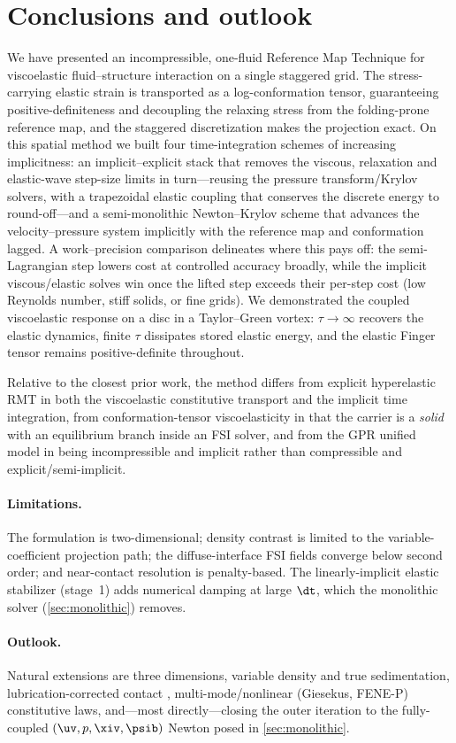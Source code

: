 \section{Conclusions and outlook}
\label{sec:conclusion}

We have presented an incompressible, one-fluid Reference Map Technique for viscoelastic
fluid--structure interaction on a single staggered grid. The stress-carrying elastic
strain is transported as a log-conformation tensor, guaranteeing positive-definiteness and
decoupling the relaxing stress from the folding-prone reference map, and the staggered
discretization makes the projection exact. On this spatial method we built four
time-integration schemes of increasing implicitness: an implicit--explicit stack that
removes the viscous, relaxation and elastic-wave step-size limits in turn---reusing the
pressure transform/Krylov solvers, with a trapezoidal elastic coupling that conserves the
discrete energy to round-off---and a semi-monolithic Newton--Krylov scheme that advances
the velocity--pressure system implicitly with the reference map and conformation lagged.
A work--precision comparison delineates where this pays off: the semi-Lagrangian step lowers
cost at controlled accuracy broadly, while the implicit viscous/elastic solves win once the
lifted step exceeds their per-step cost (low Reynolds number, stiff solids, or fine grids).
We demonstrated the coupled
viscoelastic response on a disc in a Taylor--Green vortex: $\tau\to\infty$ recovers the
elastic dynamics, finite $\tau$ dissipates stored elastic energy, and the elastic Finger
tensor remains positive-definite throughout.

Relative to the closest prior work, the method differs from explicit hyperelastic RMT
\cite{Kamrin2012,Rycroft2020,Jain2019} in both the viscoelastic constitutive transport
and the implicit time integration, from conformation-tensor viscoelasticity in that the
carrier is a \emph{solid} with an equilibrium branch inside an FSI solver, and from the
GPR unified model \cite{Peshkov2016,Dumbser2016} in being incompressible and implicit
rather than compressible and explicit/semi-implicit.

\paragraph{Limitations.} The formulation is two-dimensional; density contrast is limited
to the variable-coefficient projection path; the diffuse-interface FSI fields converge
below second order; and near-contact resolution is penalty-based. The linearly-implicit
elastic stabilizer (stage~1) adds numerical damping at large $\dt$, which the monolithic
solver (\cref{sec:monolithic}) removes.

\paragraph{Outlook.} Natural extensions are three dimensions, variable density and true
sedimentation, lubrication-corrected contact \cite{Fai2018}, multi-mode/nonlinear
(Giesekus, FENE-P) constitutive laws, and---most directly---closing the outer iteration to
the fully-coupled $(\uv,p,\xiv,\psib)$ Newton posed in \cref{sec:monolithic}.
